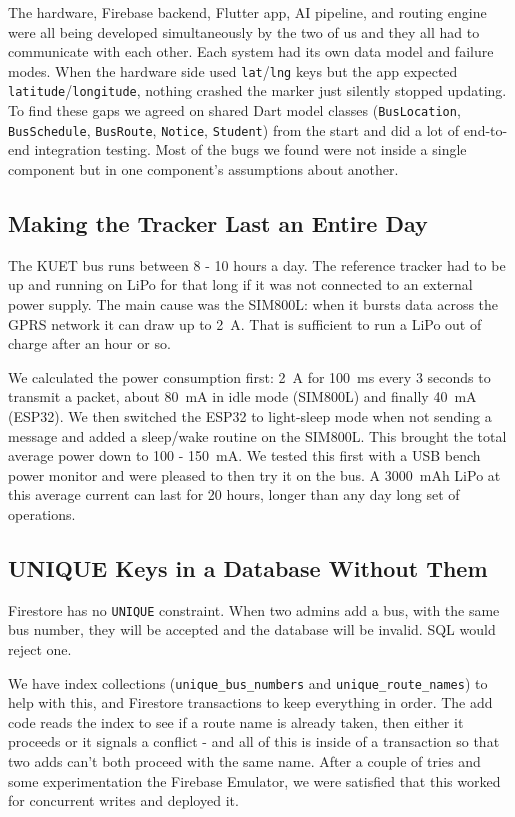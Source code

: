 \documentclass[12pt,a4paper]{report}
\begin{document}
The hardware, Firebase backend, Flutter app, AI pipeline, and routing engine were all being developed simultaneously by the two of us and they all had to communicate with each other. Each system had its own data model and failure modes. When the hardware side used \texttt{lat}/\texttt{lng} keys but the app expected \texttt{latitude}/\texttt{longitude}, nothing crashed the marker just silently stopped updating. To find these gaps we agreed on shared Dart model classes (\texttt{BusLocation}, \texttt{BusSchedule}, \texttt{BusRoute}, \texttt{Notice}, \texttt{Student}) from the start and did a lot of end-to-end integration testing. Most of the bugs we found were not inside a single component but in one component's assumptions about another.

\subsection*{Making the Tracker Last an Entire Day}

The KUET bus runs between 8 - 10 hours a day. The reference tracker had to be up and running on LiPo for that long if it was not connected to an external power supply. The main cause was the SIM800L: when it bursts data across the GPRS network it can draw up to 2~A. That is sufficient to run a LiPo out of charge after an hour or so.

We calculated the power consumption first: 2~A for 100~ms every 3 seconds to transmit a packet, about 80~mA in idle mode (SIM800L) and finally 40~mA (ESP32). We then switched the ESP32 to light-sleep mode when not sending a message and added a sleep/wake routine on the SIM800L. This brought the total average power down to 100 - 150~mA. We tested this first with a USB bench power monitor and were pleased to then try it on the bus. A 3000~mAh LiPo at this average current can last for 20 hours, longer than any day long set of operations.

\subsection*{UNIQUE Keys in a Database Without Them}

Firestore has no \texttt{UNIQUE} constraint. When two admins add a bus, with the same bus number, they will be accepted and the database will be invalid. SQL would reject one.

We have index collections (\texttt{unique\_bus\_numbers} and \texttt{unique\_route\_names}) to help with this, and Firestore transactions to keep everything in order. The add code reads the index to see if a route name is already taken, then either it proceeds or it signals a conflict - and all of this is inside of a transaction so that two adds can't both proceed with the same name. After a couple of tries and some experimentation the Firebase Emulator, we were satisfied that this worked for concurrent writes and deployed it.
\end{document}
